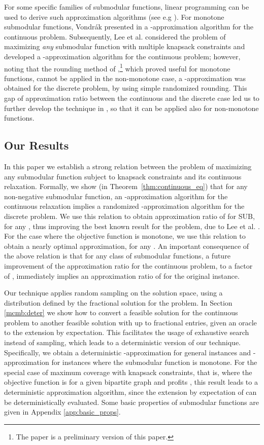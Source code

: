 \documentclass[11pt]{article}
\newcommand{\SUB}{\mbox{SUB}}
\begin{document}
{For some specific families of submodular functions,
linear programming can be used to derive such approximation algorithms
(see e.g  \cite{as04,ccpv07}). For monotone submodular functions,
Vondr\'{a}k presented in \cite{Vo08} a
-approximation algorithm for the continuous
problem. Subsequently,
Lee et al. \cite{LMNS09} considered the problem of maximizing {\em any}
submodular function with multiple knapsack constraints and developed
a -approximation algorithm for the continuous
problem; however, noting that the rounding method of \cite{KST09},\footnote{
The paper \cite{KST09} is a preliminary version of this paper.}
which proved useful for monotone functions, cannot be applied in the non-monotone case,
a -approximation was obtained for the discrete
problem, by using simple randomized rounding.
This gap of approximation ratio between the continuous and the
discrete case led us to further develop the technique in \cite{KST09},
so that it can be applied also for non-monotone functions.


\subsection{Our Results}
In this paper
we establish a strong relation
between the problem of maximizing any submodular function subject
to  knapsack constraints and its continuous relaxation.
Formally, we show (in Theorem~\ref{thm:continuous_eq}) that for
any non-negative submodular function, an -approximation
algorithm for the continuous relaxation implies a randomized
-approximation algorithm for the discrete
problem. We use this relation to
obtain approximation ratio of  for {\SUB}, for any
, thus improving the best known result for the problem,
due to Lee et al. \cite{LMNS09}. For the case where the objective
function is monotone, we use this relation to obtain a nearly
optimal  approximation, for any . An
important consequence of the above relation is that for any
class of submodular functions,
a future improvement of the approximation ratio for the continuous
problem, to a factor of ,
immediately implies an approximation ratio of  for
the original instance.

Our technique applies random sampling on the solution space, using
a distribution defined by the fractional solution for the problem.
In Section \ref{mcmb:deter} we show how to convert a feasible
solution for the continuous problem to another feasible solution
with up to  fractional entries, given an oracle to
the extension by expectation. This facilitates the usage of
exhaustive search instead of sampling, which leads to a
deterministic version of our technique. Specifically, we obtain a
deterministic -approximation for general instances
and -approximation for instances where the
submodular function is monotone.
For the special case of maximum
coverage with  knapsack constraints,
that is,  where the objective
function is   for a given bipartite graph  and
profits , this result leads to a deterministic approximation algorithm, since the extension by
expectation of  can be deterministically evaluated.
Some basic properties of submodular functions are given in
Appendix \ref{app:basic_props}.

}
\end{document}
